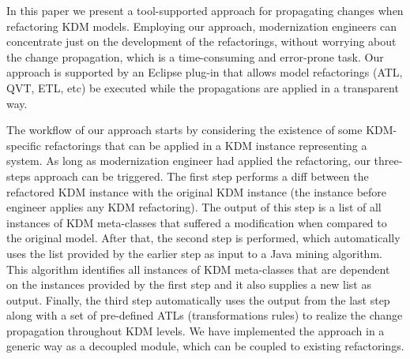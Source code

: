 In this paper we present a tool-supported approach for propagating changes when refactoring KDM models. Employing our approach, modernization engineers can concentrate just on the development of the refactorings, without worrying about the change propagation, which is a time-consuming and error-prone task. Our approach is supported by an Eclipse plug-in that allows model refactorings (ATL, QVT, ETL, etc) be executed while the propagations are applied in a transparent way.


The workflow of our approach starts by considering the existence of some KDM-specific refactorings that can be applied in a KDM instance representing a system. As long as modernization engineer had applied the refactoring, our three-steps approach can be triggered. The first step performs a diff between the refactored KDM instance with the original KDM instance (the instance before engineer applies any KDM refactoring). The output of this step is a list of all instances of KDM meta-classes that suffered a modification when compared to the original model. After that, the second step is performed, which automatically uses the list provided by the earlier step as input to a Java mining algorithm. This algorithm identifies all instances of KDM meta-classes that are dependent on the instances provided by the first step and it also supplies a new list as output.
%
%
%
Finally, the third step automatically uses the output from the last step along with a set of pre-defined ATLs (transformations rules) to realize the change propagation throughout KDM levels. We have implemented the approach in a generic way as a decoupled module, which can be coupled to existing refactorings. 



